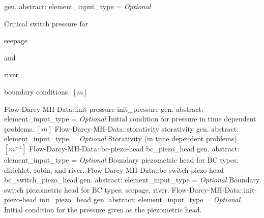 \begin{RecordType}
			{{gen. abstract: }}{{element{\_}input{\_}type}{ = }}
			{ \it{Optional}}
			{{{Critical switch pressure for }\begin{ttfamily}seepage\end{ttfamily}{ and }\begin{ttfamily}river\end{ttfamily}{ boundary conditions. }{$[m]$}%
}}
		\RecKey
			{Flow-Darcy-MH-Data::init-pressure}
			{init{\_}pressure}
			{{gen. abstract: }}{{element{\_}input{\_}type}{ = }}
			{ \it{Optional}}
			{{{Initial condition for pressure in time dependent problems. }{$[m]$}%
}}
		\RecKey
			{Flow-Darcy-MH-Data::storativity}
			{storativity}
			{{gen. abstract: }}{{element{\_}input{\_}type}{ = }}
			{ \it{Optional}}
			{{{Storativity (in time dependent problems). }{$[m^{-1}]$}%
}}
		\RecKey
			{Flow-Darcy-MH-Data::bc-piezo-head}
			{bc{\_}piezo{\_}head}
			{{gen. abstract: }}{{element{\_}input{\_}type}{ = }}
			{ \it{Optional}}
			{{{Boundary piezometric head for BC types: dirichlet, robin, and river.}%
}}
		\RecKey
			{Flow-Darcy-MH-Data::bc-switch-piezo-head}
			{bc{\_}switch{\_}piezo{\_}head}
			{{gen. abstract: }}{{element{\_}input{\_}type}{ = }}
			{ \it{Optional}}
			{{{Boundary switch piezometric head for BC types: seepage, river.}%
}}
		\RecKey
			{Flow-Darcy-MH-Data::init-piezo-head}
			{init{\_}piezo{\_}head}
			{{gen. abstract: }}{{element{\_}input{\_}type}{ = }}
			{ \it{Optional}}
			{{{Initial condition for the pressure given as the piezometric head.}%
}}
\end{RecordType}
